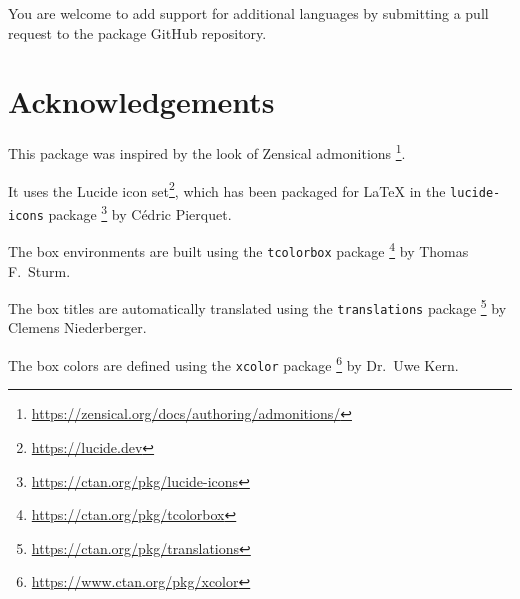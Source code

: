 \documentclass{scrartcl}
\begin{document}
You are welcome to add support for additional languages by submitting a pull
request to the package GitHub repository.

\clearpage


\section{Acknowledgements}

This package was inspired by the look of Zensical admonitions%
\footnote{\url{https://zensical.org/docs/authoring/admonitions/}}.

It uses the Lucide icon set\footnote{\url{https://lucide.dev}}, which has been
packaged for \LaTeX{} in the \texttt{lucide-icons} package%
\footnote{\url{https://ctan.org/pkg/lucide-icons}} by Cédric Pierquet.

The box environments are built using the \texttt{tcolorbox} package%
\footnote{\url{https://ctan.org/pkg/tcolorbox}} by Thomas F.\ Sturm.

The box titles are automatically translated using the \texttt{translations} package%
\footnote{\url{https://ctan.org/pkg/translations}} by Clemens Niederberger.

The box colors are defined using the \texttt{xcolor} package%
\footnote{\url{https://www.ctan.org/pkg/xcolor}} by Dr.\ Uwe Kern.
\end{document}
